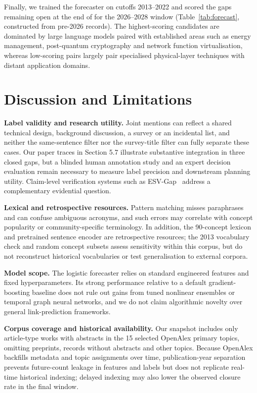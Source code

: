 \documentclass[runningheads]{llncs}
\makeatletter
\providecommand{\FloatBarrier}{\par\begingroup\let\@elt\relax
  \edef\@tempa{\@botlist\@deferlist\@dbldeferlist}\def\@tempb{}%
  \ifx\@tempa\@tempb\else\clearpage\fi\endgroup}
\makeatother
\begin{document}
Finally, we trained the forecaster on cutoffs 2013--2022 and scored the \fcGaps{} gaps remaining open at the end of \fcT{} for the 2026--2028 window (Table~\ref{tab:forecast}, constructed from pre-2026 records). The highest-scoring candidates are dominated by large language models paired with established areas such as energy management, post-quantum cryptography and network function virtualisation, whereas low-scoring pairs largely pair specialised physical-layer techniques with distant application domains.

\FloatBarrier
\section{Discussion and Limitations}
\label{sec:limits}

\textbf{Label validity and research utility.} Joint mentions can reflect a shared technical design, background discussion, a survey or an incidental list, and neither the same-sentence filter nor the survey-title filter can fully separate these cases. Our paper traces in Section 5.7 illustrate substantive integration in three closed gaps, but a blinded human annotation study and an expert decision evaluation remain necessary to measure label precision and downstream planning utility. Claim-level verification systems such as ESV-Gap~\cite{le2027esvgap} address a complementary evidential question.

\textbf{Lexical and retrospective resources.} Pattern matching misses paraphrases and can confuse ambiguous acronyms, and such errors may correlate with concept popularity or community-specific terminology. In addition, the 90-concept lexicon and pretrained sentence encoder are retrospective resources; the 2013 vocabulary check and random concept subsets assess sensitivity within this corpus, but do not reconstruct historical vocabularies or test generalisation to external corpora.

\textbf{Model scope.} The logistic forecaster relies on standard engineered features and fixed hyperparameters. Its strong performance relative to a default gradient-boosting baseline does not rule out gains from tuned nonlinear ensembles or temporal graph neural networks, and we do not claim algorithmic novelty over general link-prediction frameworks.

\textbf{Corpus coverage and historical availability.} Our snapshot includes only article-type works with abstracts in the 15 selected OpenAlex primary topics, omitting preprints, records without abstracts and other topics. Because OpenAlex backfills metadata and topic assignments over time, publication-year separation prevents future-count leakage in features and labels but does not replicate real-time historical indexing; delayed indexing may also lower the observed closure rate in the final window.
\end{document}

